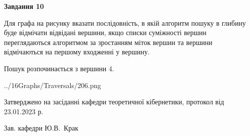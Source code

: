 \documentclass[12pt, ukrainian]{article}
\begin{document}
{\begin {large}
{\begin {center}\textbf{Завдання 10}\end {center}}\par
Для графа на рисунку вказати послідовність, в якій алгоритм пошуку в глибину буде відмічати відвідані вершини, якщо списки суміжності вершин переглядаються алгоритмом за зростанням міток вершин та вершини відмічаються на першому вход\-женні у вершину.\par
Пошук розпочинається з вершини 4.\par

\begin{center}
	{../16Graphs/Traversals/206.png}
\end{center}\par
\newpage


\end {large}
}
{\smallskip \begin {small} Затверджено на засіданні кафедри теоретичної кібернетики, протокол  від   23.01.2023 р.\par\smallskip\smallskip
{\parbox {6.5 cm}{Зав. кафедри \dotfill Ю.В.~Крак}} \end{small}}
\end{document}
